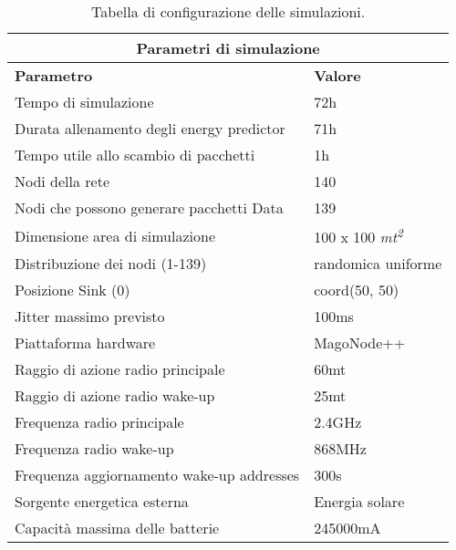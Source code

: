 \begin{table}[h]
    \setlength\doublerulesep{1mm} 
    \begin{tabular}{ |p{8cm}|p{4cm}|  }
        \hline
        \multicolumn{2}{|c|}{\textbf{Parametri di simulazione}}\\
        \hline \hline
        \textbf{Parametro}  & \textbf{Valore}\\
        \hline
        Tempo di simulazione                            & 72h \\
        Durata allenamento degli energy predictor       & 71h \\
        Tempo utile allo scambio di pacchetti           & 1h \\
        Nodi della rete                                 & 140 \\
        Nodi che possono generare pacchetti Data        & 139 \\
        Dimensione area di simulazione                  & 100 x 100 \textit{ mt\textsuperscript{2}}\\
        Distribuzione dei nodi (1-139)                  & randomica uniforme \\
        Posizione Sink (0)                              & coord(50, 50) \\
        Jitter massimo previsto                         & 100ms \\
        Piattaforma hardware                            & MagoNode++ \\
        Raggio di azione radio principale               & 60mt \\
        Raggio di azione radio wake-up                  & 25mt \\
        Frequenza radio principale                      & 2.4GHz \\
        Frequenza radio wake-up                         & 868MHz \\
        Frequenza aggiornamento wake-up addresses       & 300s \\
        Sorgente energetica esterna                     & Energia solare \\
        Capacità massima delle batterie                 & 245000mA \\
        \hline
    \end{tabular}
    \centering
    \vspace*{5mm}
    \caption{Tabella di configurazione delle simulazioni.}
    \label{configs}
\end{table}